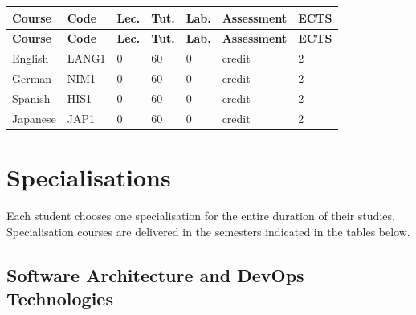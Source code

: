 \documentclass[12pt,a4paper]{article}
\newcommand{\thdrule}{\noalign{\global\setlength{\extrarowheight}{0pt}}}
\newcommand{\thdend}{\noalign{\global\setlength{\extrarowheight}{4pt}}}
\begin{document}
{\scriptsize
\begin{longtable}{m{5.5cm}m{0.8cm}m{1cm}m{1cm}m{1cm}m{1.7cm}m{0.7cm}}
\thdrule\toprule
\rowcolor{pjatkRed}
{\color{white}\footnotesize\textbf{\vphantom{Ag}Course}} & {\color{white}\footnotesize\textbf{\vphantom{Ag}Code}} & {\color{white}\footnotesize\textbf{\vphantom{Ag}Lec.}} & {\color{white}\footnotesize\textbf{\vphantom{Ag}Tut.}} & {\color{white}\footnotesize\textbf{\vphantom{Ag}Lab.}} & {\color{white}\footnotesize\textbf{\vphantom{Ag}Assessment}} & {\color{white}\footnotesize\textbf{\vphantom{Ag}ECTS}} \\
\midrule\thdend
\endfirsthead
\thdrule\toprule
\rowcolor{pjatkRed}
{\color{white}\footnotesize\textbf{\vphantom{Ag}Course}} & {\color{white}\footnotesize\textbf{\vphantom{Ag}Code}} & {\color{white}\footnotesize\textbf{\vphantom{Ag}Lec.}} & {\color{white}\footnotesize\textbf{\vphantom{Ag}Tut.}} & {\color{white}\footnotesize\textbf{\vphantom{Ag}Lab.}} & {\color{white}\footnotesize\textbf{\vphantom{Ag}Assessment}} & {\color{white}\footnotesize\textbf{\vphantom{Ag}ECTS}} \\
\midrule\thdend
\endhead
\rowcolor{tableRowLight} English & LANG1 & 0 & 60 & 0 & {\scriptsize credit} & 2 \\
\rowcolor{tableRowAlt} German & NIM1 & 0 & 60 & 0 & {\scriptsize credit} & 2 \\
\rowcolor{tableRowLight} Spanish & HIS1 & 0 & 60 & 0 & {\scriptsize credit} & 2 \\
\rowcolor{tableRowAlt} Japanese & JAP1 & 0 & 60 & 0 & {\scriptsize credit} & 2 \\
\bottomrule
\end{longtable}}



\newpage

\section{Specialisations}

Each student chooses one specialisation for the entire duration of their studies. Specialisation courses are delivered in the semesters indicated in the tables below.

\subsection*{Software Architecture and DevOps Technologies}
\end{document}
